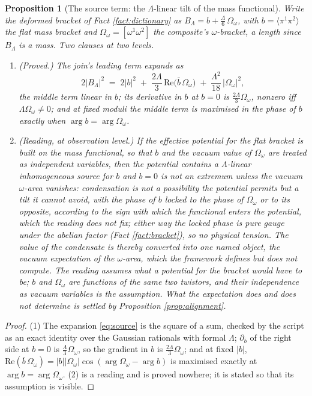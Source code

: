 \documentclass[11pt]{article}
\newtheorem{proposition}[theorem]{Proposition}
\theoremstyle{definition}
\newcommand{\br}[1]{\langle #1\rangle}
\begin{document}
\begin{proposition}[The source term: the $\Lambda$-linear tilt of the mass functional]\label{prop:source}
Write the deformed bracket of Fact \ref{fact:dictionary} as $B_{\Lambda} = b + \tfrac{\Lambda}{6}\,\Omega_{\omega}$, with $b = \br{\pi^{1}\pi^{2}}$ the flat mass bracket and $\Omega_{\omega} = [\omega^{1}\omega^{2}]$ the composite's $\omega$-bracket, a length since $B_{\Lambda}$ is a mass. Two clauses at two levels.
\begin{enumerate}
\item \emph{(Proved.)} The join's leading term expands as
\begin{equation}\label{eq:source}
2|B_{\Lambda}|^{2} \;=\; 2|b|^{2} \;+\; \frac{2\Lambda}{3}\,\mathrm{Re}\bigl(\bar{b}\,\Omega_{\omega}\bigr) \;+\; \frac{\Lambda^{2}}{18}\,|\Omega_{\omega}|^{2},
\end{equation}
the middle term linear in $b$; its derivative in $b$ at $b = 0$ is $\tfrac{2\Lambda}{3}\Omega_{\omega}$, nonzero iff $\Lambda\Omega_{\omega} \ne 0$; and at fixed moduli the middle term is maximised in the phase of $b$ exactly when $\arg b = \arg\Omega_{\omega}$.
\item \emph{(Reading, at observation level.)} If the effective potential for the flat bracket is built on the mass functional, so that $b$ and the vacuum value of $\Omega_{\omega}$ are treated as independent variables, then the potential contains a $\Lambda$-linear inhomogeneous source for $b$ and $b = 0$ is not an extremum unless the vacuum $\omega$-area vanishes: condensation is not a possibility the potential permits but a tilt it cannot avoid, with the phase of $b$ locked to the phase of $\Omega_{\omega}$ or to its opposite, according to the sign with which the functional enters the potential, which the reading does not fix; either way the locked phase is pure gauge under the abelian factor (Fact \ref{fact:bracket}), so no physical tension. The value of the condensate is thereby converted into one named object, the vacuum expectation of the $\omega$-area, which the framework defines but does not compute. The reading assumes what a potential for the bracket would have to be; $b$ and $\Omega_{\omega}$ are functions of the same two twistors, and their independence as vacuum variables is the assumption. What the expectation does and does not determine is settled by Proposition \ref{prop:alignment}.
\end{enumerate}
\end{proposition}

\begin{proof}
(1) The expansion \eqref{eq:source} is the square of a sum, checked by the script as an exact identity over the Gaussian rationals with formal $\Lambda$; $\partial_{\bar b}$ of the right side at $b = 0$ is $\tfrac{\Lambda}{3}\Omega_{\omega}$, so the gradient in $b$ is $\tfrac{2\Lambda}{3}\Omega_{\omega}$; and at fixed $|b|$, $\mathrm{Re}(\bar b\,\Omega_{\omega}) = |b||\Omega_{\omega}|\cos(\arg\Omega_{\omega} - \arg b)$ is maximised exactly at $\arg b = \arg\Omega_{\omega}$. (2) is a reading and is proved nowhere; it is stated so that its assumption is visible.
\end{proof}
\end{document}
